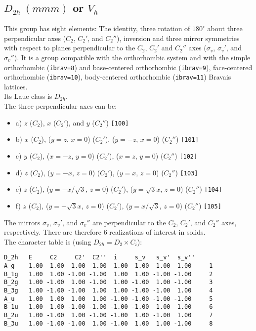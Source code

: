 \documentclass[12pt,a4paper]{article}
\begin{document}
\subsection{\color{web-blue}$D_{2h}\ (mmm)$ or $V_h$}  
This group has eight elements: The identity, three rotation of $180^\circ$
about three perpendicular axes ($C_2$, $C_2'$, and $C_2''$),
inversion and three mirror symmetries with respect to planes perpendicular to
the $C_2$, $C_2'$ and $C_2''$ axes ($\sigma_v$, $\sigma_v'$, and $\sigma_v''$).
It is a group compatible with the orthorhombic system and with the
simple orthorhombic (\texttt{ibrav=8}) and base-centered 
orthorhombic (\texttt{ibrav=9}), face-centered orthorhombic (\texttt{ibrav=10}),
body-centered orthorhombic (\texttt{ibrav=11}) Bravais lattices. \\
Its Laue class is $D_{2h}$. \\
The three perpendicular axes can be:
\begin{itemize}
\item
a) $z$ ($C_2$), $x$ ($C_2'$), and $y$ ($C_2''$) \texttt{[100]}
\item
b) $x$ ($C_2$), ($y=z$, $x=0$) ($C_2'$), ($y=-z$, $x=0$) ($C_2''$) 
\texttt{[101]}
\item
c) $y$ ($C_2$), ($x=-z$, $y=0$) ($C_2'$), ($x=z$, $y=0$) ($C_2''$) 
\texttt{[102]}
\item
d) $z$ ($C_2$), ($y=-x$, $z=0$) ($C_2'$), ($y=x$, $z=0$) ($C_2''$) 
\texttt{[103]}
\item
e) $z$ ($C_2$), ($y=-x/\sqrt{3}$, $z=0$) ($C_2'$), ($y=\sqrt{3}x$, $z=0$) 
($C_2''$) \texttt{[104]}
\item
f) $z$ ($C_2$), ($y=-\sqrt{3}x$, $z=0$) ($C_2'$), ($y=x/\sqrt{3}$, $z=0$) 
($C_2''$) \texttt{[105]}
\end{itemize}
The mirrors $\sigma_v$, $\sigma_v'$, and $\sigma_v''$  are perpendicular to 
the $C_2$, $C_2'$, and $C_2''$ axes, respectively.
There are therefore $6$ realizations of interest in solids. \\
The character table is (using $D_{2h}=D_2 \times C_i$):
\begin{verbatim}
D_2h   E     C2     C2'  C2''  i     s_v   s_v'  s_v''
A_g    1.00  1.00  1.00  1.00  1.00  1.00  1.00  1.00     1 
B_1g   1.00  1.00 -1.00 -1.00  1.00  1.00 -1.00 -1.00     2
B_2g   1.00 -1.00  1.00 -1.00  1.00 -1.00  1.00 -1.00     3
B_3g   1.00 -1.00 -1.00  1.00  1.00 -1.00 -1.00  1.00     4
A_u    1.00  1.00  1.00  1.00 -1.00 -1.00 -1.00 -1.00     5
B_1u   1.00  1.00 -1.00 -1.00 -1.00 -1.00  1.00  1.00     6
B_2u   1.00 -1.00  1.00 -1.00 -1.00  1.00 -1.00  1.00     7
B_3u   1.00 -1.00 -1.00  1.00 -1.00  1.00  1.00 -1.00     8
\end{verbatim}
\end{document}
